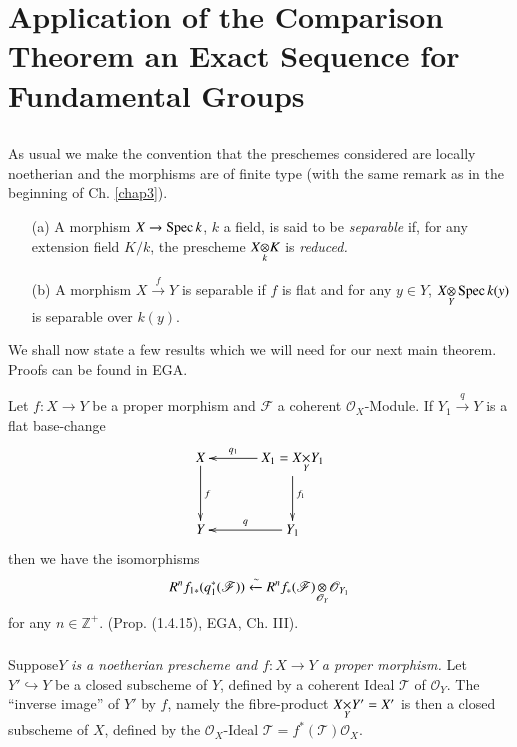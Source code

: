\chapter[Application of the Comparison Theorem....]{Application of the Comparison Theorem an Exact Sequence for
  Fundamental Groups}\label{chap6}


\section{}\label{chap6-sec6.1}\pageoriginale
As usual we make the convention that the preschemes considered are
locally noetherian and the morphisms are of finite type (with the same
remark as in the beginning of Ch. \ref{chap3}). 

\begin{defin}\label{defin6.1.1}
\begin{itemize}
\item[(a)] A morphism $X\to \operatorname{Spec} k$, $k$ a field, is said to be {\em
  separable} if, for any extension field $K/k$, the prescheme
  $\foprod{X}{K}{k}$ is {\em reduced.}

\item[(b)] A morphism $X\xrightarrow{f}Y$ is separable if $f$ is flat and
  for any $y\in Y$, $\foprod{X}{\Spec k(y)}{Y}$ is separable over $k(y)$.
\end{itemize}

We shall now state a few results which we will need for our next main
theorem. Proofs can be found in EGA.
\end{defin}

\setcounter{theorem}{1}
\begin{theorem}\label{chap6-thm6.1.2}
Let $f:X\to Y$ be a proper morphism and $\mathscr{F}$ a coherent
$\mathscr{O}_{X}$-Module. If $Y_{1}\xrightarrow{q}Y$ is a flat
base-change
\[
\xymatrix@=1.2cm{
X\ar[d]^{f} & \ar[l]_-{q_{1}} X_{1}=\fprod{X}{Y_{1}}{Y}\ar[d]^{f_{1}}\\
Y & \ar[l]_-{q} Y_{1} 
}
\]
then we have the isomorphisms
$$
R^{n}f_{1\ast}(q^{\ast}_{1}(\mathscr{F}))\xleftarrow{\sim}\foprod{R^{n}f_{\ast}(\mathscr{F})}{\mathscr{O}_{Y_{1}}}{\mathscr{O}_{Y}} 
$$
for any $n\in \mathbb{Z}^{+}$. (Prop. (1.4.15), EGA, Ch. III).
\end{theorem}

\setcounter{subsection}{2}
\subsection{}\label{chap6-sec6.1.3}
Suppose\pageoriginale $Y$ {\em is a noetherian prescheme and $f:X\to
  Y$ a proper morphism.} Let $Y'\hookrightarrow Y$ be a closed
subscheme of $Y$, defined by a coherent Ideal $\mathscr{T}$ of
$\mathscr{O}_{Y}$. The ``inverse image'' of $Y'$ by $f$, namely the
fibre-product $\fprod{X}{Y'}{Y}=X'$ is then a closed subscheme of $X$,
defined by the $\mathscr{O}_{X}$-Ideal
$\mathscr{T}=f^{\ast}(\mathscr{T})\mathscr{O}_{X}$.

